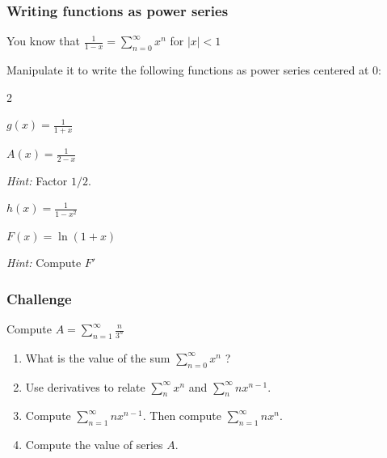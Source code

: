 \documentclass[14pt]{beamer}
\begin{document}
\begin{frame}[t]
	\frametitle{Writing functions as power series}

	You know that \quad $\displaystyle \frac{1}{1-x}= \sum_{n=0}^{\infty}x^{n}$
	\quad for $|x|<1$

	Manipulate it to write the following functions as power series centered at 0:
	\begin{enumerate}
	\end{enumerate}
\end{frame}

\begin{frame}[t]
	\frametitle{Challenge}

	Compute \quad $\displaystyle A = \sum_{n=1}^{\infty}\frac{n}{3^{n}}$

	\hrulefill

	\begin{enumerate}
		\item What is the value of the sum $\displaystyle \sum_{n=0}^{\infty}x^{n}$ ?

		\item Use derivatives to relate $\displaystyle \sum_{n}^{\infty}x^{n}$ and $\displaystyle
			\sum_{n}^{\infty}nx^{n-1}$.

		\item Compute $\displaystyle \sum_{n=1}^{\infty}n x^{n-1}$. \quad Then
			compute $\displaystyle \sum_{n=1}^{\infty}n x^{n}$.

		\item Compute the value of series $A$.
	\end{enumerate}
\end{frame}
\end{document}
